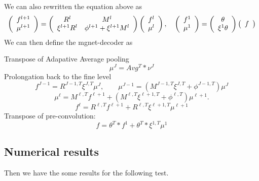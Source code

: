 We can also rewritten the equation above as
\[
\left( \begin{array}{l}
f^{l+1} \\
\mu^{l+1}
\end{array} \right) = \left( {\begin{array}{*{20}{c}}
	R^l & M^l\\
	\xi^{l+1}R^l&\phi^{l+1}+\xi^{l+1}M^l
	\end{array}} \right)\left( \begin{array}{l}
f^{l}\\
\mu^{l}
\end{array} \right), \quad
\left( \begin{array}{l}
f^{1} \\
\mu^{1}
\end{array} \right) = \left( {\begin{array}{{c}}
	\theta \\
	\xi^{1}\theta
	\end{array}} \right)\left( \begin{array}{l}
f\\
\end{array} \right)
\]
We can then define the mgnet-decoder as
\begin{breakablealgorithm}%
	\caption{$f = {{\rm MgNet_{transpose}}}(u^J; J,\nu_1, \cdots, \nu_J)$}
	\begin{algorithmic}
		\State Transpose of Adapative Average pooling
		$$\mu^J = Avg^T \ast \nu^J $$
		\State Prolongation back to the fine level 
		\State 
		$$
		f^{J-1} = R^{J-1, T}\xi^{J, T}\mu^J,  \qquad \mu^{J-1} = (M^{J-1,T}\xi^{J, T} + \phi^{J-1, T})\mu^{J}
		$$
		\State
		\begin{equation}
		\mu^{\ell}= M^{\ell,T}f^{\ell+1} + (M^{\ell,T}\xi^{\ell+1, T} + \phi^{\ell, T})\mu^{\ell+1}.
		\end{equation}
		\State
		\begin{equation}
		f^{\ell} = R^{\ell, T}f^{\ell+1} + R^{\ell, T}\xi^{\ell+1, T}\mu^{\ell+1}
		\end{equation}
		\EndFor
		\State Transpose of pre-convolution:
		$$
		f = \theta^T \ast f^1 + \theta^T \ast \xi^{1,T} \mu^1
		$$
	\end{algorithmic}
\end{breakablealgorithm}

\subsection{Numerical results}
Then we have the some results for the following test.

